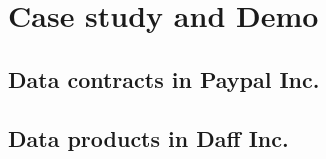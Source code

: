 \documentclass[12pt, a4paper]{book}
\begin{document}
\section{Case study and Demo}
\subsection{Data contracts in Paypal Inc.}

\subsection{Data products in Daff Inc.}

\begingroup
\backmatter
{}
\renewcommand\bibname{References}
\endgroup

\clearpage
\end{document}
